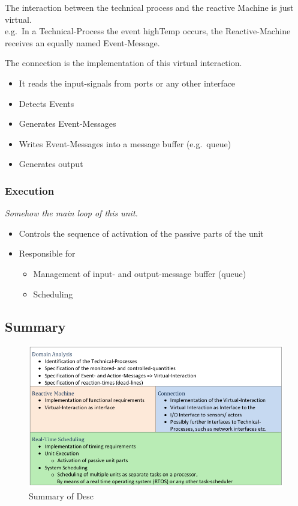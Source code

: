 The interaction between the technical process and the reactive Machine
is just virtual.\\
e.g.~In a Technical-Process the event highTemp occurs, the
Reactive-Machine receives an equally named Event-Message.

The connection is the implementation of this virtual interaction. 
\begin{itemize}
    \item It reads the input-signals from ports or any other interface
    \item Detects Events
    \item  Generates Event-Messages
    \item Writes Event-Messages into a message buffer (e.g.~queue)
    \item Generates output
\end{itemize}

\hypertarget{execution}{%
\subsubsection{Execution}\label{execution}}

\emph{Somehow the main loop of this unit.}

\begin{itemize}
\tightlist
\item
  Controls the sequence of activation of the passive parts of the unit
\item
  Responsible for

  \begin{itemize}
  \tightlist
  \item
    Management of input- and output-message buffer (queue)
  \item
    Scheduling
  \end{itemize}
\end{itemize}

\hypertarget{summary}{%
\subsection{Summary}\label{summary}}

\begin{figure}[H]
\centering
\includegraphics[width=1\textwidth]{figures/summaryDesc.png}
\caption{Summary of Desc}
\end{figure}

\clearpage